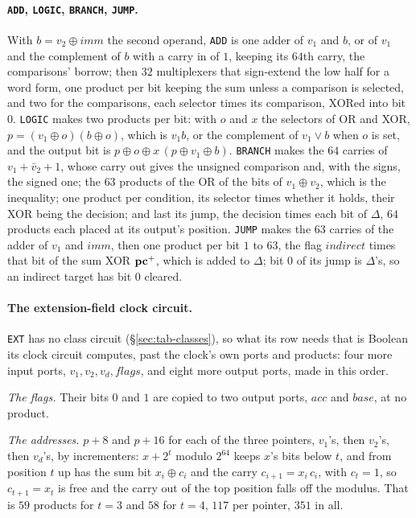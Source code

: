 \paragraph{\texttt{ADD}, \texttt{LOGIC}, \texttt{BRANCH}, \texttt{JUMP}.} With $b=v_2\oplus\mathit{imm}$ the second operand, \texttt{ADD} is one adder of $v_1$ and $b$, or of $v_1$ and the complement of $b$ with a carry in of $1$, keeping its $64$th carry, the comparisons' borrow; then $32$ multiplexers that sign-extend the low half for a word form, one product per bit keeping the sum unless a comparison is selected, and two for the comparisons, each selector times its comparison, XORed into bit $0$. \texttt{LOGIC} makes two products per bit: with $o$ and $x$ the selectors of OR and XOR, $p=(v_1\oplus o)(b\oplus o)$, which is $v_1b$, or the complement of $v_1\vee b$ when $o$ is set, and the output bit is $p\oplus o\oplus x\,(p\oplus v_1\oplus b)$. \texttt{BRANCH} makes the $64$ carries of $v_1+\bar v_2+1$, whose carry out gives the unsigned comparison and, with the signs, the signed one; the $63$ products of the OR of the bits of $v_1\oplus v_2$, which is the inequality; one product per condition, its selector times whether it holds, their XOR being the decision; and last its jump, the decision times each bit of $\Delta$, $64$ products each placed at its output's position. \texttt{JUMP} makes the $63$ carries of the adder of $v_1$ and $\mathit{imm}$, then one product per bit $1$ to $63$, the flag $\mathit{indirect}$ times that bit of the sum XOR $\mathbf{pc}^{+}$, which is added to $\Delta$; bit $0$ of its jump is $\Delta$'s, so an indirect target has bit $0$ cleared.

\paragraph{The extension-field clock circuit.} \texttt{EXT} has no class circuit (\S\ref{sec:tab-classes}), so what its row needs that is Boolean its clock circuit computes, past the clock's own ports and products: four more input ports, $v_1,v_2,v_d,\mathit{flags}$, and eight more output ports, made in this order.

\emph{The flags.} Their bits $0$ and $1$ are copied to two output ports, $\mathit{acc}$ and $\mathit{base}$, at no product.

\emph{The addresses.} $p+8$ and $p+16$ for each of the three pointers, $v_1$'s, then $v_2$'s, then $v_d$'s, by incrementers: $x+2^{t}$ modulo $2^{64}$ keeps $x$'s bits below $t$, and from position $t$ up has the sum bit $x_i\oplus c_i$ and the carry $c_{i+1}=x_i\,c_i$, with $c_t=1$, so $c_{t+1}=x_t$ is free and the carry out of the top position falls off the modulus. That is $59$ products for $t=3$ and $58$ for $t=4$, $117$ per pointer, $351$ in all.

